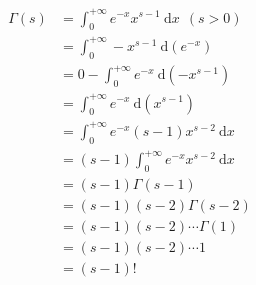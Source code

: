 \documentclass{article}
\begin{document}
	\large
	\setlength{\baselineskip}{3em}
	
	\renewcommand{\d}[1][x]{\ \text{d}#1}
	\newcommand{\intinf}{\int_{0}^{+\infty}}
	
	\begin{align*}
		\Gamma(s) & = \intinf e^{-x} x^{s-1} \d \ \ (s > 0)
		\\
		& = \intinf -x^{s-1} \d[(e^{-x})]
		\\
		& = 0 - \intinf e^{-x} \d[(-x^{s-1})]
		\\
		& = \intinf e^{-x} \d[(x^{s-1})]
		\\
		& = \intinf e^{-x} (s - 1) x^{s-2} \d
		\\
		& = (s - 1) \intinf e^{-x} x^{s-2} \d
		\\
		& = (s - 1) \Gamma(s - 1)
		\\
		& = (s - 1) (s - 2) \Gamma(s - 2)
		\\
		& = (s - 1) (s - 2) \cdots \Gamma(1)
		\\
		& = (s - 1) (s - 2) \cdots 1
		\\
		& = (s - 1)!
	\end{align*}
\end{document}
